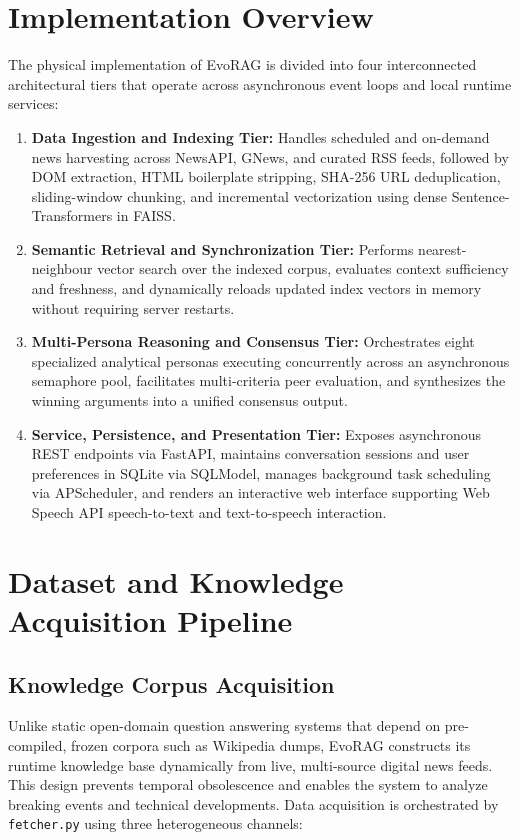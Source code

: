 \section{Implementation Overview}
\label{sec:impl_overview}
The physical implementation of EvoRAG is divided into four interconnected architectural tiers that operate across asynchronous event loops and local runtime services:
\begin{enumerate}[label=(\roman*)]
    \item \textbf{Data Ingestion and Indexing Tier:} Handles scheduled and on-demand news harvesting across NewsAPI, GNews, and curated RSS feeds, followed by DOM extraction, HTML boilerplate stripping, SHA-256 URL deduplication, sliding-window chunking, and incremental vectorization using dense Sentence-Transformers in FAISS.
    \item \textbf{Semantic Retrieval and Synchronization Tier:} Performs nearest-neighbour vector search over the indexed corpus, evaluates context sufficiency and freshness, and dynamically reloads updated index vectors in memory without requiring server restarts.
    \item \textbf{Multi-Persona Reasoning and Consensus Tier:} Orchestrates eight specialized analytical personas executing concurrently across an asynchronous semaphore pool, facilitates multi-criteria peer evaluation, and synthesizes the winning arguments into a unified consensus output.
    \item \textbf{Service, Persistence, and Presentation Tier:} Exposes asynchronous REST endpoints via FastAPI, maintains conversation sessions and user preferences in SQLite via SQLModel, manages background task scheduling via APScheduler, and renders an interactive web interface supporting Web Speech API speech-to-text and text-to-speech interaction.
\end{enumerate}

\section{Dataset and Knowledge Acquisition Pipeline}
\label{sec:dataset_pipeline}

\subsection{Knowledge Corpus Acquisition}
Unlike static open-domain question answering systems that depend on pre-compiled, frozen corpora such as Wikipedia dumps, EvoRAG constructs its runtime knowledge base dynamically from live, multi-source digital news feeds. This design prevents temporal obsolescence and enables the system to analyze breaking events and technical developments. Data acquisition is orchestrated by \texttt{fetcher.py} using three heterogeneous channels:

